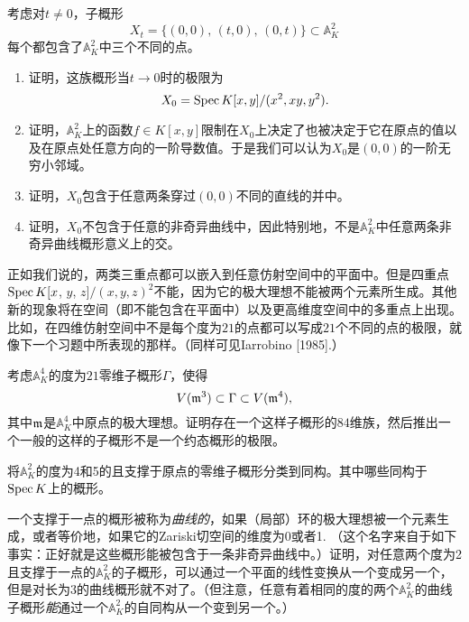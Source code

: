 \begin{exe}
	考虑对$t\neq 0$，子概形
	\[
	X_t=\{(0,0)\text{, }(t,0)\text{, }(0,t)\}\subset \mathbb{A}_K^2
	\]
	每个都包含了$\mathbb{A}_{K}^2$中三个不同的点。

	\begin{enumerate}[{(a)}]\setlength{\itemsep}{0pt}
		\item 证明，这族概形当$t\to 0$时的极限为
		\[
		X_0=\operatorname{Spec} K[x,y]/(x^2,xy,y^2).
		\]
		\item 证明，$\mathbb{A}_K^2$上的函数$f\in K[x,y]$限制在$X_0$上决定了也被决定于它在原点的值以及在原点处任意方向的一阶导数值。于是我们可以认为$X_0$是$(0,0)$的一阶无穷小邻域。
		\item 证明，$X_0$包含于任意两条穿过$(0,0)$不同的直线的并中。
		\item 证明，$X_0$不包含于任意的非奇异曲线中，因此特别地，不是$\mathbb{A}_K^2$中任意两条非奇异曲线概形意义上的交。
	\end{enumerate}
\end{exe}

正如我们说的，两类三重点都可以嵌入到任意仿射空间中的平面中。但是四重点$\operatorname{Spec} K[x$, $y$, $z]/(x,y,z)^2$不能，因为它的极大理想不能被两个元素所生成。其他新的现象将在空间（即不能包含在平面中）以及更高维度空间中的多重点上出现。比如，在四维仿射空间中不是每个度为$21$的点都可以写成$21$个不同的点的极限，就像下一个习题中所表现的那样。（同样可见Iarrobino [1985].）

\begin{exe}
	考虑$\mathbb{A}_K^4$的度为$21$零维子概形$\Gamma$，使得
	\[
	V(\mathfrak{m}^3)\subset \Gamma \subset V(\mathfrak{m}^4),
	\]
	其中$\mathfrak{m}$是$\mathbb{A}_K^4$中原点的极大理想。证明存在一个这样子概形的$84$维族，然后推出一个一般的这样的子概形不是一个约态概形的极限。
\end{exe}

\begin{exe}
	将$\mathbb{A}_K^2$的度为4和5的且支撑于原点的零维子概形分类到同构。其中哪些同构于$\operatorname{Spec} K$上的概形。
\end{exe}

\begin{exe}
	一个支撑于一点的概形被称为\textit{曲线的}，如果（局部）环的极大理想被一个元素生成，或者等价地，如果它的Zariski切空间的维度为0或者1. （这个名字来自于如下事实：正好就是这些概形能被包含于一条非奇异曲线中。）证明，对任意两个度为2且支撑于一点的$\mathbb{A}_K^2$的子概形，可以通过一个平面的线性变换从一个变成另一个，但是对长为3的曲线概形就不对了。（但注意，任意有着相同的度的两个$\mathbb{A}_K^2$的曲线子概形\textit{能}通过一个$\mathbb{A}_K^2$的自同构从一个变到另一个。）
\end{exe}

